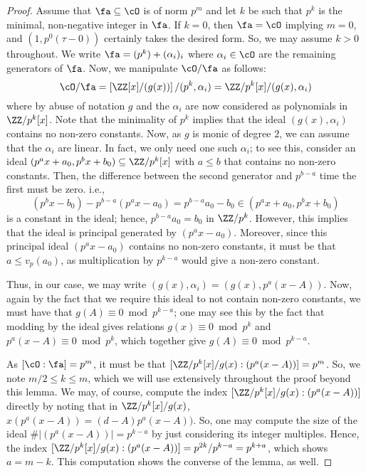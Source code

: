 \documentclass[11pt, proquest]{uwthesis}
\begin{document}
  \begin{proof}
    Assume that $\fa\subseteq \cO$ is of norm $p^m$ and let $k$ be such that $p^k$ is the minimal, non-negative integer in $\fa$.
    If $k=0$, then $\fa =\cO$ implying $m=0$, and $(1,p^0(\tau-0))$ certainly takes the desired form.
    So, we may assume $k>0$ throughout.
    We write $\fa = (p^k) + (\alpha_i)_i$ where $\alpha_i\in \cO$ are the remaining generators of $\fa$.
    Now, we manipulate $\cO/\fa$ as follows:
    \[
    \cO/\fa = \left[\ZZ[x]/(g(x))\right]/(p^k,\alpha_i) = \ZZ/p^k[x]/(g(x),\alpha_i)
    \]
    where by abuse of notation $g$ and the $\alpha_i$ are now considered as polynomials in $\ZZ/p^k[x]$. Note that the minimality of $p^k$ implies that the ideal $(g(x),\alpha_i)$ contains no non-zero constants.
    Now, as $g$ is monic of degree $2$, we can assume that the $\alpha_i$ are linear.
    In fact, we only need one such $\alpha_i$; to see this, consider an ideal $(p^ax+a_0,p^bx+b_0)\subseteq \ZZ/p^k[x]$ with $a\leq b$ that contains no non-zero constants.
    Then, the difference between the second generator and $p^{b-a}$ time the first must be zero. i.e.,
    \[
    (p^bx-b_0)-p^{b-a}(p^{a}x-a_0) = p^{b-a}a_0-b_0\in (p^ax+a_0,p^bx+b_0)
    \]
    is a constant in the ideal; hence, $p^{b-a}a_0=b_0$ in $\ZZ/p^k$. However, this implies that the ideal is principal generated by $(p^ax-a_0)$.
    Moreover, since this principal ideal $(p^ax-a_0)$ contains no non-zero constants, it must be that $a \leq v_p(a_0)$, as multiplication by $p^{k-a}$ would give a non-zero constant.

    Thus, in our case, we may write $(g(x),\alpha_i) = (g(x), p^a(x-A))$.
    Now, again by the fact that we require this ideal to not contain non-zero constants, we must have that $g(A) \equiv 0\bmod p^{k-a}$; one may see this by the fact that modding by the ideal gives relations $g(x) \equiv 0 \bmod p^k$ and $p^a(x-A)\equiv 0\bmod p^k$, which together give $g(A)\equiv 0\bmod p^{k-a}$.

    As $[\cO:\fa] = p^m$, it must be that $[\ZZ/p^k[x]/g(x):(p^a(x-A))] = p^m$.
    So, we note $m/2\leq k\leq m$, which we will use extensively throughout the proof beyond this lemma.
    We may, of course, compute the index $[\ZZ/p^k[x]/g(x):(p^a(x-A))]$ directly by noting that in $\ZZ/p^k[x]/g(x)$, $x(p^a(x-A)) = (d-A)p^a(x-A))$.
    So, one may compute the size of the ideal $\#|(p^a(x-A))| = p^{k-a}$ by just considering its integer multiples.
    Hence, the index $[\ZZ/p^k[x]/g(x):(p^a(x-A))]=p^{2k}/p^{k-a}=p^{k+a}$, which shows $a=m-k$.
    This computation shows the converse of the lemma, as well.


\end{proof}
\end{document}
